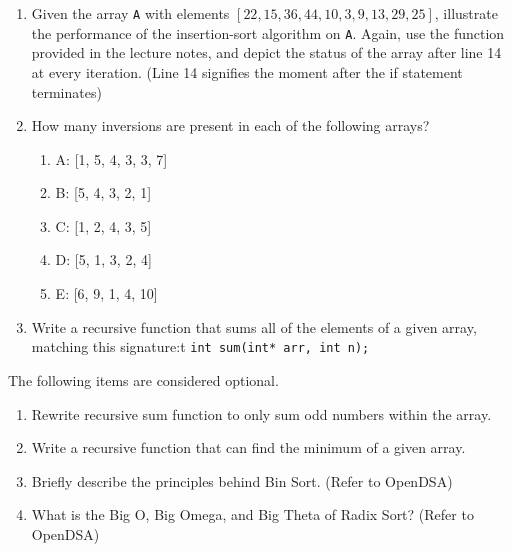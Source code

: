 \documentclass[11pt]{article}
\begin{document}
\begin{enumerate}
    \item Given the array \verb|A| with elements $[22, 15, 36, 44, 10, 3, 9, 13, 29, 25]$, illustrate the performance of the insertion-sort algorithm on \verb|A|. Again, use the function provided in the lecture notes, and depict the status of the array after line 14 at every iteration. (Line 14 signifies the moment after the if statement terminates)
    
    \item How many inversions are present in each of the following arrays?
    \begin{enumerate}
        \item[] A: [1, 5, 4, 3, 3, 7]
        \item[] B: [5, 4, 3, 2, 1]
        \item[] C: [1, 2, 4, 3, 5]
        \item[] D: [5, 1, 3, 2, 4]
        \item[] E: [6, 9, 1, 4, 10]
    \end{enumerate}

    \item Write a recursive function that sums all of the elements of a given array, matching this signature:t \lstinline{int sum(int* arr, int n);}
    
\end{enumerate}

The following items are considered optional.

\begin{enumerate}
    \item Rewrite recursive sum function to only sum odd numbers within the array.
    \item Write a recursive function that can find the minimum of a given array.
    \item Briefly describe the principles behind Bin Sort. (Refer to OpenDSA)
    \item What is the Big O, Big Omega, and Big Theta of Radix Sort? (Refer to OpenDSA)
\end{enumerate}

\label{r:lastpage}
\end{document}
